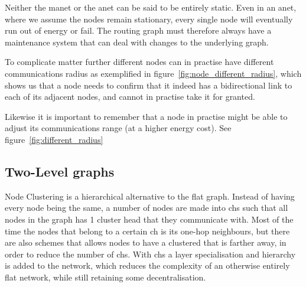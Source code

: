 Neither the \ac{manet} or the \ac{anet} can be said to be entirely static. Even in an \ac{anet}, where we assume the nodes remain stationary, every single node will eventually run out of energy or fail. The routing graph must therefore always have a maintenance system that can deal with changes to the underlying graph. 

To complicate matter further different nodes can in practise have different communications radius as exemplified in figure~\ref{fig:node_different_radius}, which shows us that a node needs to confirm that it indeed has a bidirectional link to each of its adjacent nodes, and cannot in practise take it for granted.


Likewise it is important to remember that a node in practise might be able to adjust its communications range (at a higher energy cost). See figure~\ref{fig:different_radius}

\subsection{Two-Level graphs}

\label{section:cluster_methods}
Node Clustering is a hierarchical alternative to the flat graph. Instead of having every node being the same, a number of nodes are made into \acp{ch} such that all nodes in the graph has 1 cluster head that they communicate with. Most of the time the nodes that belong to a certain \ac{ch} is its one-hop neighbours, but there are also schemes that allows nodes to have a clustered that is farther away, in order to reduce the number of \acp{ch}. With \acp{ch} a layer specialisation and hierarchy is added to the network, which reduces the complexity of an otherwise entirely flat network, while still retaining some decentralisation.

